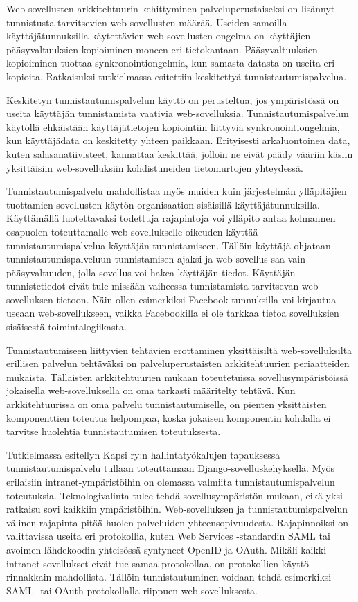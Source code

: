 Web-sovellusten arkkitehtuurin kehittyminen palveluperustaiseksi on lisännyt tunnistusta tarvitsevien web-sovellusten määrää. Useiden samoilla käyttäjätunnuksilla käytettävien web-sovellusten ongelma on käyttäjien pääsyvaltuuksien kopioiminen moneen eri tietokantaan. Pääsyvaltuuksien kopioiminen tuottaa synkronointiongelmia, kun samasta datasta on useita eri kopioita. Ratkaisuksi tutkielmassa esitettiin keskitettyä tunnistautumispalvelua.

Keskitetyn tunnistautumispalvelun käyttö on perusteltua, jos ympäristössä on useita käyttäjän tunnistamista vaativia web-sovelluksia. Tunnistautumispalvelun käytöllä ehkäistään käyttäjätietojen kopiointiin liittyviä synkronointiongelmia, kun käyttäjädata on keskitetty yhteen paikkaan. Erityisesti arkaluontoinen data, kuten salasanatiivisteet, kannattaa keskittää, jolloin ne eivät päädy vääriin käsiin yksittäisiin web-sovelluksiin kohdistuneiden tietomurtojen yhteydessä.

Tunnistautumispalvelu mahdollistaa myös muiden kuin järjestelmän ylläpitäjien tuottamien sovellusten käytön organisaation sisäisillä käyttäjätunnuksilla. Käyttämällä luotettavaksi todettuja rajapintoja voi ylläpito antaa kolmannen osapuolen toteuttamalle web-sovellukselle oikeuden käyttää tunnistautumispalvelua käyttäjän tunnistamiseen. Tällöin käyttäjä ohjataan tunnistautumispalveluun tunnistamisen ajaksi ja web-sovellus saa vain pääsyvaltuuden, jolla sovellus voi hakea käyttäjän tiedot. Käyttäjän tunnistetiedot eivät tule missään vaiheessa tunnistamista tarvitsevan web-sovelluksen tietoon. Näin ollen esimerkiksi Facebook-tunnuksilla voi kirjautua useaan web-sovellukseen, vaikka Facebookilla ei ole tarkkaa tietoa sovelluksien sisäisestä toimintalogiikasta.

Tunnistautumiseen liittyvien tehtävien erottaminen yksittäisiltä web-sovelluksilta erillisen palvelun tehtäväksi on palveluperustaisten arkkitehtuurien periaatteiden mukaista. Tällaisten arkkitehtuurien mukaan toteutetuissa sovellusympäristöissä jokaisella web-sovelluksella on oma tarkasti määritelty tehtävä. Kun arkkitehtuurissa on oma palvelu tunnistautumiselle, on pienten yksittäisten komponenttien toteutus helpompaa, koska jokaisen komponentin kohdalla ei tarvitse huolehtia tunnistautumisen toteutuksesta.

Tutkielmassa esitellyn Kapsi ry:n hallintatyökalujen tapauksessa tunnistautumispalvelu tullaan toteuttamaan Django-sovelluskehyksellä. Myös erilaisiin intranet-ympäristöihin on olemassa valmiita tunnistautumispalvelun toteutuksia. Teknologivalinta tulee tehdä sovellusympäristön mukaan, eikä yksi ratkaisu sovi kaikkiin ympäristöihin. Web-sovelluksen ja tunnistautumispalvelun välinen rajapinta pitää huolen palveluiden yhteensopivuudesta. Rajapinnoiksi on valittavissa useita eri protokollia, kuten Web Services -standardin SAML tai avoimen lähdekoodin yhteisössä syntyneet OpenID ja OAuth. Mikäli kaikki intranet-sovellukset eivät tue samaa protokollaa, on protokollien käyttö rinnakkain mahdollista. Tällöin tunnistautuminen voidaan tehdä esimerkiksi SAML- tai OAuth-protokollalla riippuen web-sovelluksesta.

